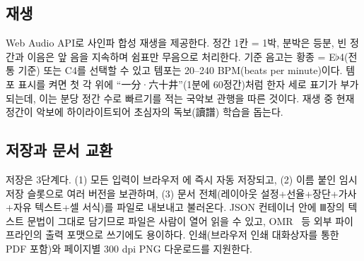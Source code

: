 \subsection{재생}

Web Audio API로 사인파 합성 재생을 제공한다. 정간 1칸 = 1박, 분박은 등분,
빈 정간과 이음은 앞 음을 지속하며 쉼표만 무음으로 처리한다.
기준 음고는 황종 = E$\flat$4(전통 기준) 또는 C4를 선택할 수 있고
템포는 20--240 BPM(beats per minute)이다. 템포 표시를 켜면 첫 각 위에
``一分·六十井''(1분에 60정간)처럼 한자 세로 표기가 부가되는데, 이는
분당 정간 수로 빠르기를 적는 국악보 관행을 따른 것이다. 재생 중 현재
정간이 악보에 하이라이트되어 초심자의 독보(讀譜) 학습을 돕는다.

\subsection{저장과 문서 교환}

저장은 3단계다. (1) 모든 입력이 브라우저 에 즉시
자동 저장되고, (2) 이름 붙인 임시 저장 슬롯으로 여러 버전을 보관하며,
(3) 문서 전체(레이아웃 설정+선율+장단+가사+자유 텍스트+셀 서식)를
 파일로 내보내고 불러온다. JSON 컨테이너 안에 Ⅲ장의
텍스트 문법이 그대로 담기므로 파일은 사람이 열어 읽을 수 있고,
OMR~\cite{kim2025omr} 등 외부 파이프라인의 출력 포맷으로 쓰기에도 용이하다.
인쇄(브라우저 인쇄 대화상자를 통한 PDF 포함)와 페이지별 300 dpi PNG
다운로드를 지원한다.
